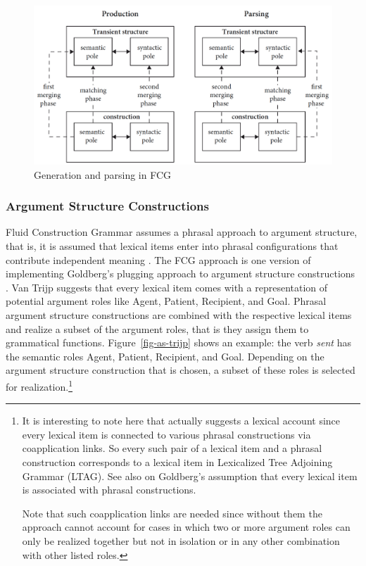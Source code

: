 \begin{figure}
\includegraphics[width=.98\textwidth]{Figures/production-parsing-fcg.png}
\caption{\label{fig-matching-merging-trijp}Generation and parsing in FCG \citep[]{vanTrijp2013a}}
\end{figure}%

\subsubsection{Argument Structure Constructions}

Fluid Construction Grammar assumes a phrasal approach to argument structure, that is, it is assumed that lexical items enter
into phrasal configurations that contribute independent meaning \citep{vanTrijp2011a}. The FCG
approach is one version of implementing Goldberg's plugging approach to argument structure
constructions \citep{Goldberg95a}. Van Trijp suggests that every lexical item comes with a representation of
potential argument roles like Agent, Patient, Recipient, and Goal. Phrasal argument structure
constructions are combined with the respective lexical items and realize a subset of the argument
roles, that is they assign them to grammatical functions. Figure~\vref{fig-as-trijp} shows an
example: the verb \emph{sent} has the semantic roles Agent, Patient, Recipient, and Goal. Depending
on the argument structure construction that is chosen, a subset of these roles is selected for
realization.\footnote{
  It is interesting to note here that \citet[]{vanTrijp2011a} actually suggests a lexical
  account since every lexical item is connected to various phrasal constructions via coapplication
  links. So every such pair of a lexical item and a phrasal construction corresponds to a lexical
  item in Lexicalized Tree Adjoining Grammar (LTAG). See also  on
  Goldberg's assumption that every lexical item is associated with phrasal constructions.

Note that such coapplication links are needed since without them the approach cannot account for
cases in which two or more argument roles can only be realized together but not in isolation or in
any other combination with other listed roles.
}

